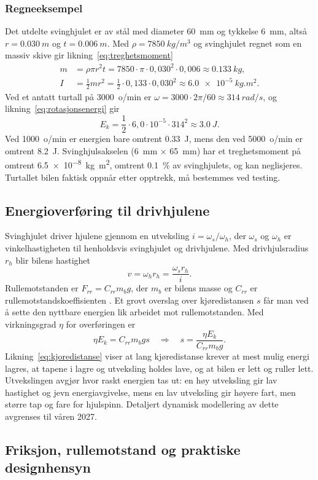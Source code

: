 \subsubsection{Regneeksempel}
Det utdelte svinghjulet er av stål med diameter \SI{60}{mm} og tykkelse \SI{6}{mm}, altså $r = \SI{0,030}{m}$ og $t = \SI{0,006}{m}$. Med $\rho = \SI{7850}{kg/m^3}$ og svinghjulet regnet som en massiv skive gir likning~\eqref{eq:treghetsmoment}
\begin{align*}
    m &= \rho \pi r^2 t = 7850 \cdot \pi \cdot 0{,}030^2 \cdot 0{,}006 \approx \SI{0,133}{kg} , \\
    I &= \frac{1}{2} m r^2 = \frac{1}{2} \cdot 0{,}133 \cdot 0{,}030^2 \approx \SI{6,0e-5}{kg.m^2} .
\end{align*}
Ved et antatt turtall på \SI{3000}{o/min} er $\omega = 3000 \cdot 2\pi/60 \approx \SI{314}{rad/s}$, og likning~\eqref{eq:rotasjonsenergi} gir
\begin{equation*}
    E_k = \frac{1}{2} \cdot 6{,}0 \cdot 10^{-5} \cdot 314^2 \approx \SI{3,0}{J} .
\end{equation*}
Ved \SI{1000}{o/min} er energien bare omtrent \SI{0,33}{J}, mens den ved \SI{5000}{o/min} er omtrent \SI{8,2}{J}. Svinghjulsakselen (\SI{6}{mm} $\times$ \SI{65}{mm}) har et treghetsmoment på omtrent \SI{6,5e-8}{kg.m^2}, omtrent \SI{0,1}{\percent} av svinghjulets, og kan neglisjeres. Turtallet bilen faktisk oppnår etter opptrekk, må bestemmes ved testing.

\subsection{Energioverføring til drivhjulene}
Svinghjulet driver hjulene gjennom en utveksling $i = \omega_s / \omega_h$, der $\omega_s$ og $\omega_h$ er vinkelhastigheten til henholdsvis svinghjulet og drivhjulene. Med drivhjulsradius $r_h$ blir bilens hastighet \parencite{harkegaard_2004}
\begin{equation}
    v = \omega_h r_h = \frac{\omega_s r_h}{i} .
    \label{eq:hastighet}
\end{equation}
Rullemotstanden er $F_{rr} = C_{rr} m_b g$, der $m_b$ er bilens masse og $C_{rr}$ er rullemotstandskoeffisienten \parencite{engineeringtoolbox_rolling}. Et grovt overslag over kjøredistansen $s$ får man ved å sette den nyttbare energien lik arbeidet mot rullemotstanden. Med virkningsgrad $\eta$ for overføringen er
\begin{equation}
    \eta E_k = C_{rr} m_b g s \quad \Rightarrow \quad s = \frac{\eta E_k}{C_{rr} m_b g} .
    \label{eq:kjoredistanse}
\end{equation}
Likning~\eqref{eq:kjoredistanse} viser at lang kjøredistanse krever at mest mulig energi lagres, at tapene i lagre og utveksling holdes lave, og at bilen er lett og ruller lett. Utvekslingen avgjør hvor raskt energien tas ut: en høy utveksling gir lav hastighet og jevn energiavgivelse, mens en lav utveksling gir høyere fart, men større tap og fare for hjulspinn. Detaljert dynamisk modellering av dette avgrenses til våren 2027.

\subsection{Friksjon, rullemotstand og praktiske designhensyn}
